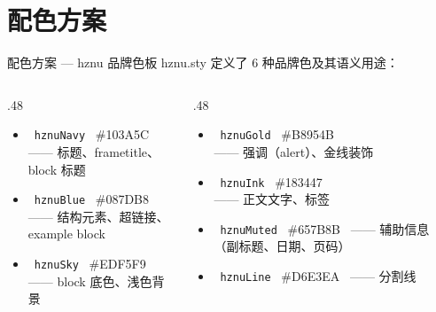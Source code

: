 \documentclass[10pt,aspectratio=169]{beamer}
\begin{document}
\section{配色方案}
\begin{frame}{配色方案 — hznu 品牌色板}
  hznu.sty 定义了 6 种品牌色及其语义用途：

  \vspace{.3cm}
  \begin{columns}[T]
    \begin{column}{.48\textwidth}
      \begin{itemize}
        \item {}\,
          {\tt hznuNavy} \ \#103A5C \\ —— 标题、frametitle、block 标题
        \item {}\,
          {\tt hznuBlue} \ \#087DB8 \\ —— 结构元素、超链接、example block
        \item {}\,
          {\tt hznuSky} \ \#EDF5F9 \ \\ —— block 底色、浅色背景
      \end{itemize}
    \end{column}
    \begin{column}{.48\textwidth}
      \begin{itemize}
        \item {}\,
          {\tt hznuGold} \ \#B8954B \\ —— 强调（alert）、金线装饰
        \item {}\,
          {\tt hznuInk} \ \#183447 \ \\ —— 正文文字、标签
        \item {}\,
          {\tt hznuMuted} \ \#657B8B \ —— 辅助信息（副标题、日期、页码）
        \item {}\,
          {\tt hznuLine} \ \#D6E3EA \ —— 分割线
      \end{itemize}
    \end{column}
  \end{columns}
\end{frame}
\end{document}
